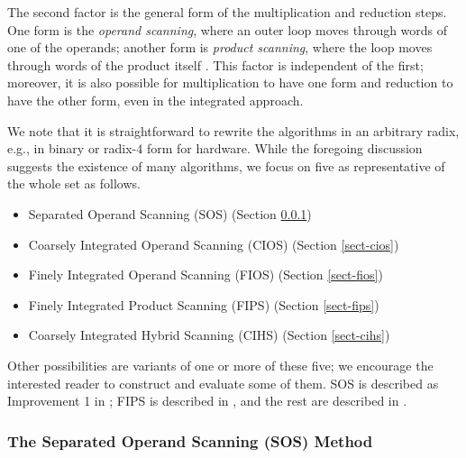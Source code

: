 \documentclass[twocolumn]{svjour3}          %
\begin{document}
The second factor is the general form of the multiplication and
reduction steps. One form is the {\em operand scanning}, where an
outer loop moves through words of one of the operands; another form
is {\em product scanning}, where the loop moves through words of the
product itself \cite{K93:The}. This factor is independent of the
first; moreover, it is also possible for multiplication to have one
form and reduction to have the other form, even in the integrated
approach.

We note that it is straightforward to rewrite the algorithms in an
arbitrary radix, e.g., in binary or radix-$4$ form for hardware.
%
While the foregoing discussion suggests the existence of many
algorithms, we focus on five as representative of the whole set as
follows.
%
\begin{itemize}\parskip 0pt
\item Separated Operand Scanning (SOS)
      (Section \ref{sect-sos})
\item Coarsely Integrated Operand Scanning (CIOS)
      (Section \ref{sect-cios})
\item Finely Integrated Operand Scanning (FIOS)
      (Section \ref{sect-fios})
\item Finely Integrated Product Scanning (FIPS)
      (Section \ref{sect-fips})
\item Coarsely Integrated Hybrid Scanning (CIHS)
      (Section \ref{sect-cihs})
\end{itemize}
%
Other possibilities are variants of one or more of these five; we
encourage the interested reader to construct and evaluate some of
them.  SOS is described as Improvement 1 in \cite{DK90:A}; FIPS is
described in \cite{K93:The}, and the rest are described in
\cite{KAK96:Analyzing}.

\subsubsection{The Separated Operand Scanning (SOS) Method}
\label{sect-sos}
\end{document}
